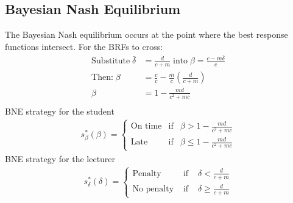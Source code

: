 \documentclass[11pt,preprint, authoryear]{elsarticle}
\numberwithin{equation}{section}
\numberwithin{figure}{section}
\numberwithin{table}{section}
\begin{document}
\hypertarget{bayesian-nash-equilibrium}{%
\subsection*{\texorpdfstring{Bayesian Nash Equilibrium
\label{bay}}{Bayesian Nash Equilibrium }}\label{bayesian-nash-equilibrium}}

The Bayesian Nash equilibrium occurs at the point where the best
response functions intersect. For the BRFs to cross: \begin{align*}
\text{Substitute} \; \bar{\delta} &= \frac{d}{c+m} \; \text{into} \; \beta=\frac{c-m\bar{\delta}}{c} \\
\text{Then:} \; \beta&=\frac{c}{c}-\frac{m}{c}\left(\frac{d}{c+m}\right) \\
\beta&=1-\frac{m d}{c^{2}+m c} \\
\end{align*} BNE strategy for the student \begin{align*}
s_{\beta}^{*}(\beta)=\left\{\begin{array}{lll}
\text{On time} & \text{if} & \beta>1-\frac{m d}{c^{2}+m c} \\
\text{Late} & \text{if} & \beta \leq 1-\frac{m d}{c^{2}+m c}
\end{array}\right.
\end{align*} BNE strategy for the lecturer \begin{align*}
s_{\delta}^{*}(\delta)=\left\{\begin{array}{lll}
\text{Penalty} & \text { if } & \delta<\frac{d}{c+m} \\
\text{No penalty} & \text { if } & \delta \geq \frac{d}{c+m}
\end{array}\right.
\end{align*}


\end{document}
